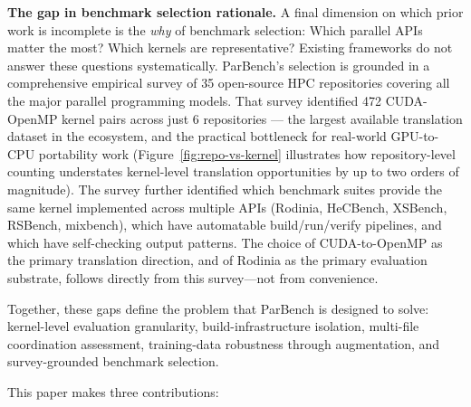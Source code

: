 \documentclass{article}
\begin{document}
\textbf{The gap in benchmark selection rationale.} A final dimension on which prior work is incomplete is the \emph{why} of benchmark selection: Which parallel APIs matter the most? Which kernels are representative? Existing frameworks do not answer these questions systematically. ParBench's selection is grounded in a comprehensive empirical survey of 35 open-source HPC repositories covering all the major parallel programming models. That survey identified 472 CUDA-OpenMP kernel pairs across just 6 repositories --- the largest available translation dataset in the ecosystem, and the practical bottleneck for real-world GPU-to-CPU portability work (Figure~\ref{fig:repo-vs-kernel} illustrates how repository-level counting understates kernel-level translation opportunities by up to two orders of magnitude). The survey further identified which benchmark suites provide the same kernel implemented across multiple APIs (Rodinia, HeCBench, XSBench, RSBench, mixbench), which have automatable build/run/verify pipelines, and which have self-checking output patterns. The choice of CUDA-to-OpenMP as the primary translation direction, and of Rodinia as the primary evaluation substrate, follows directly from this survey---not from convenience.

Together, these gaps define the problem that ParBench is designed to solve: kernel-level evaluation granularity, build-infrastructure isolation, multi-file coordination assessment, training-data robustness through augmentation, and survey-grounded benchmark selection.

This paper makes three contributions:
\end{document}

